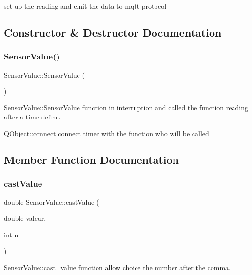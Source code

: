 set up the reading and emit the data to mqtt protocol 

\subsection{Constructor \& Destructor Documentation}
\mbox{\label{classSensorValue_aed70ed5c17088bb9b420d9d63b9379bd}} 
\subsubsection{\texorpdfstring{Sensor\+Value()}{SensorValue()}}
{\footnotesize\ttfamily Sensor\+Value\+::\+Sensor\+Value (\begin{DoxyParamCaption}{ }\end{DoxyParamCaption})}



\hyperlink{classSensorValue_aed70ed5c17088bb9b420d9d63b9379bd}{Sensor\+Value\+::\+Sensor\+Value} function in interruption and called the function reading after a time define. 

Q\+Object\+::connect connect timer with the function who will be called

\subsection{Member Function Documentation}
\mbox{\label{classSensorValue_a15d579b0938d2a8933f88563b108d150}} 
\subsubsection{\texorpdfstring{cast\+Value}{castValue}}
{\footnotesize\ttfamily double Sensor\+Value\+::cast\+Value (\begin{DoxyParamCaption}\item[{double}]{valeur,  }\item[{int}]{n }\end{DoxyParamCaption})\hspace{0.3cm}{\ttfamily [slot]}}



Sensor\+Value\+::cast\+\_\+value function allow choice the number after the comma. 


